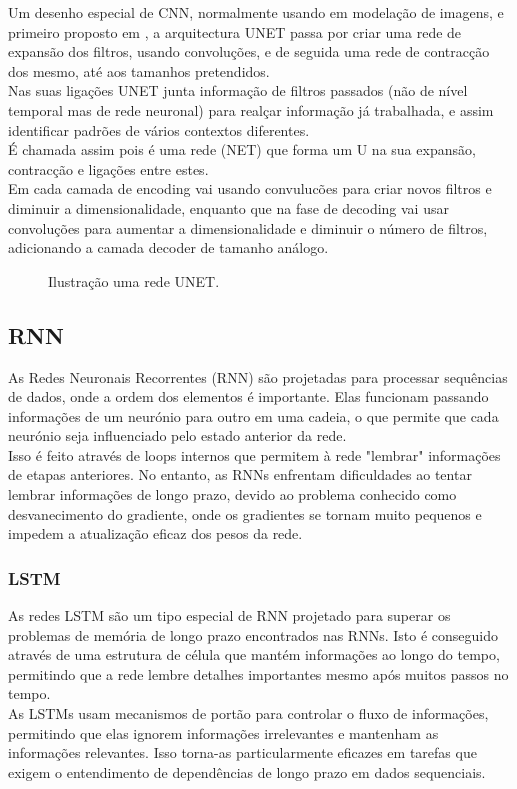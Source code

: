 Um desenho especial de \gls{CNN}, normalmente usando em modelação de imagens, e primeiro proposto em \cite{Shelhamer2014}, a arquitectura UNET passa por criar uma rede de expansão dos filtros, usando convoluções, e de seguida uma rede de contracção dos mesmo, até aos tamanhos pretendidos.\\
Nas suas ligações UNET junta informação de filtros passados (não de nível temporal mas de rede neuronal) para realçar informação já trabalhada, e assim identificar padrões de vários contextos diferentes.\\
É chamada assim pois é uma rede (NET) que forma um U na sua expansão, contracção e ligações entre estes.\\
Em cada camada de encoding vai usando convulucões para criar novos filtros e diminuir a dimensionalidade, enquanto que na fase de decoding vai usar convoluções para aumentar a dimensionalidade e diminuir o número de filtros, adicionando a camada decoder de tamanho análogo.\\

\begin{figure}[H]
	\centering
	\resizebox{\linewidth}{!}{}
	\caption{Ilustração uma rede UNET.}
	\label{fig:unet_graph}
\end{figure}


\subsection{RNN\label{se:rnn_sec}}

As Redes Neuronais Recorrentes (RNN) são projetadas para processar sequências de dados, onde a ordem dos elementos é importante. Elas funcionam passando informações de um neurónio para outro em uma cadeia, o que permite que cada neurónio seja influenciado pelo estado anterior da rede.\\
Isso é feito através de loops internos que permitem à rede "lembrar" informações de etapas anteriores. No entanto, as RNNs enfrentam dificuldades ao tentar lembrar informações de longo prazo, devido ao problema conhecido como desvanecimento do gradiente, onde os gradientes se tornam muito pequenos e impedem a atualização eficaz dos pesos da rede.\\

\subsubsection{LSTM\label{se:lstms_sec}}

As redes \gls{LSTM} são um tipo especial de RNN projetado para superar os problemas de memória de longo prazo encontrados nas RNNs. Isto é conseguido através de uma estrutura de célula que mantém informações ao longo do tempo, permitindo que a rede lembre detalhes importantes mesmo após muitos passos no tempo.\\
As \gls{LSTM}s usam mecanismos de portão para controlar o fluxo de informações, permitindo que elas ignorem informações irrelevantes e mantenham as informações relevantes. Isso torna-as particularmente eficazes em tarefas que exigem o entendimento de dependências de longo prazo em dados sequenciais.\\


